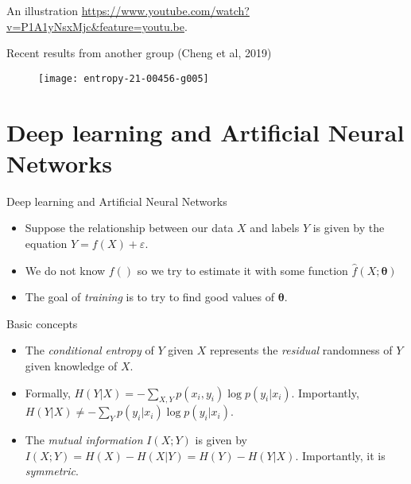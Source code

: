 \documentclass{beamer}
\begin{document}
\begin{frame}{An illustration}
	\url{https://www.youtube.com/watch?v=P1A1yNsxMjc&feature=youtu.be}. 
\end{frame}

\begin{frame}{Recent results from another group (Cheng et al, 2019)}
\begin{figure}
	\centering
	\texttt{[image: entropy-21-00456-g005]}
	\label{fig:entropy-21-00456-g005}
\end{figure}
\end{frame}


\section{Deep learning and Artificial Neural Networks}
\begin{frame}{Deep learning and Artificial Neural Networks}
\begin{itemize}
	\item Suppose the relationship between our data $X$ and labels $Y$ is given by the equation $Y = f(X) + \varepsilon$. 
	\item We do not know $f()$ so we try to estimate it with some function $\hat{f}(X; \boldsymbol{\theta})$
	\item The goal of \emph{training} is to try to find good values of $\boldsymbol{\theta}$. 
\end{itemize}
\end{frame}

\begin{frame}{Basic concepts}
\begin{itemize}
	\item The \emph{conditional entropy} of $Y$ given $X$ represents the \emph{residual} randomness of $Y$ given knowledge of $X$. 
	\item Formally, $H(Y|X)= -\sum_{X,Y} p(x_i,y_i) \log p(y_i | x_i)$. Importantly,  $H(Y|X) \neq -\sum_{Y} p(y_i|x_i) \log p(y_i | x_i)$.
	\item The \emph{mutual information} $I(X;Y)$ is given by
	$I(X;Y) = H(X) - H(X|Y) = H(Y) - H(Y|X)$. Importantly, it is \emph{symmetric}. 
\end{itemize}
\end{frame}
\end{document}
